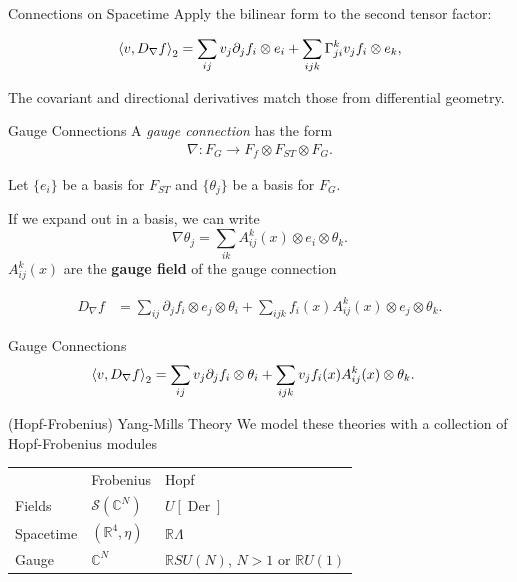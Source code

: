 \documentclass[presentation]{beamer}
\begin{document}
\begin{frame}[label={sec:orgb91f87e},fragile]{Connections on Spacetime}
 Apply the bilinear form to the second tensor factor:

\begin{equation*}
\left\langle v,D_\nabla f \right\rangle_2 = \sum_{ij} v_j \partial_j f_i \otimes e_i + \sum_{ijk} \Gamma^k_{ji} v_j f_i \otimes e_k,
\end{equation*}

\bigskip

The covariant and directional derivatives match those from differential geometry.
\end{frame}
\begin{frame}[label={sec:org7ce0bc4},fragile]{Gauge Connections}
 A \emph{gauge connection} has the form
\begin{align*}
\nabla: F_{G} \to F_f \otimes F_{ST} \otimes F_{G}.
\end{align*}

Let \(\{ e_i \}\) be a basis for \(F_{ST}\) and \(\{ \theta_j \}\) be a basis for \(F_G\).

 If we expand out in a basis, we can write
\[
\nabla \theta_j = \sum_{ik} A_{ij}^k(x) \otimes e_i \otimes \theta_k.
\]
\(A_{ij}^k(x)\) are the \textbf{gauge field} of the gauge connection

\begin{align*}
D_\nabla f 
&= \sum_{ij} \partial_j f_i \otimes e_j \otimes \theta_i + \sum_{ijk} f_i(x)  A_{ij}^k(x) \otimes e_j \otimes \theta_k.
\end{align*}
\end{frame}
\begin{frame}[label={sec:orgb2be270},fragile]{Gauge Connections}
\begin{align*}
\left\langle v,D_\nabla f  \right\rangle_2
&= \sum_{ij} v_j \partial_j f_i \otimes \theta_i + \sum_{ijk} v_j f_i(x)  A_{ij}^k(x) \otimes \theta_k.
\end{align*}
\begin{block}{(Hopf-Frobenius) Yang-Mills Theory}
We model these theories  with a collection of Hopf-Frobenius modules

{\renewcommand{\arraystretch}{2.0}
\begin{center}
\begin{tabularx}{\textwidth}{XXX}
 & Frobenius & Hopf\\
Fields & \(\mathcal{S}(\mathbb{C}^{N})\) & \(U[\operatorname{Der}]\)\\
Spacetime & \((\mathbb{R}^{4}, \eta)\) & \(\mathbb{R} \Lambda\)\\
Gauge & \(\mathbb{C}^N\) & \(\mathbb{R}SU(N)\), \(N > 1\) or \(\mathbb{R}U(1)\)\\
\end{tabularx}
\end{center}
}
\end{block}
\end{frame}
\end{document}

